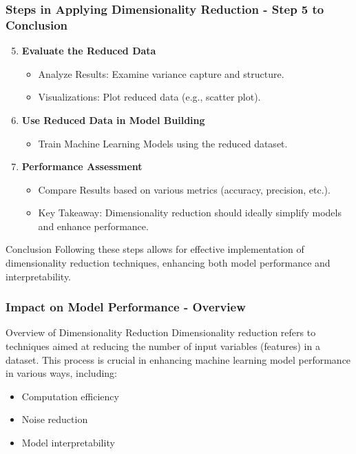 \documentclass[aspectratio=169]{beamer}
\begin{document}
\begin{frame}[fragile]
    \frametitle{Steps in Applying Dimensionality Reduction - Step 5 to Conclusion}
    
    \begin{enumerate}
        \setcounter{enumi}{4} %
        \item \textbf{Evaluate the Reduced Data}
        \begin{itemize}
            \item Analyze Results: Examine variance capture and structure.
            \item Visualizations: Plot reduced data (e.g., scatter plot).
        \end{itemize}

        \item \textbf{Use Reduced Data in Model Building}
        \begin{itemize}
            \item Train Machine Learning Models using the reduced dataset.
        \end{itemize}

        \item \textbf{Performance Assessment}
        \begin{itemize}
            \item Compare Results based on various metrics (accuracy, precision, etc.).
            \item Key Takeaway: Dimensionality reduction should ideally simplify models and enhance performance.
        \end{itemize}
    \end{enumerate}

    \begin{block}{Conclusion}
        Following these steps allows for effective implementation of dimensionality reduction techniques, enhancing both model performance and interpretability.
    \end{block}
\end{frame}

\begin{frame}[fragile]
    \frametitle{Impact on Model Performance - Overview}
    \begin{block}{Overview of Dimensionality Reduction}
        Dimensionality reduction refers to techniques aimed at reducing the number of input variables (features) in a dataset. This process is crucial in enhancing machine learning model performance in various ways, including:
        \begin{itemize}
            \item Computation efficiency
            \item Noise reduction
            \item Model interpretability
        \end{itemize}
    \end{block}
\end{frame}
\end{document}
